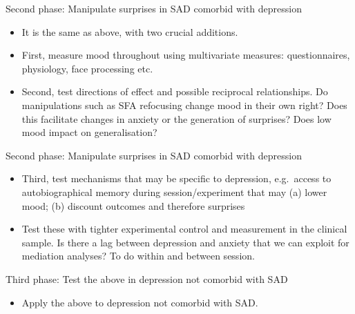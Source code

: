 \documentclass[
  ignorenonframetext,
]{beamer}
\providecommand{\tightlist}{%
  \setlength{\itemsep}{0pt}\setlength{\parskip}{0pt}}
\begin{document}
\begin{frame}{Second phase: Manipulate surprises in SAD comorbid with
depression}
\protect\hypertarget{second-phase-manipulate-surprises-in-sad-comorbid-with-depression}{}

\begin{itemize}
\item
  It is the same as above, with two crucial additions.
\item
  First, measure mood throughout using multivariate measures:
  questionnaires, physiology, face processing etc.
\item
  Second, test directions of effect and possible reciprocal
  relationships. Do manipulations such as SFA refocusing change mood in
  their own right? Does this facilitate changes in anxiety or the
  generation of surprises? Does low mood impact on generalisation?
\end{itemize}

\end{frame}

\begin{frame}{Second phase: Manipulate surprises in SAD comorbid with
depression}
\protect\hypertarget{second-phase-manipulate-surprises-in-sad-comorbid-with-depression-1}{}

\begin{itemize}
\item
  Third, test mechanisms that may be specific to depression, e.g.~access
  to autobiographical memory during session/experiment that may (a)
  lower mood; (b) discount outcomes and therefore surprises
\item
  Test these with tighter experimental control and measurement in the
  clinical sample. Is there a lag between depression and anxiety that we
  can exploit for mediation analyses? To do within and between session.
\end{itemize}

\end{frame}

\begin{frame}{Third phase: Test the above in depression not comorbid
with SAD}
\protect\hypertarget{third-phase-test-the-above-in-depression-not-comorbid-with-sad}{}

\begin{itemize}
\tightlist
\item
  Apply the above to depression not comorbid with SAD.
\end{itemize}

\end{frame}
\end{document}
